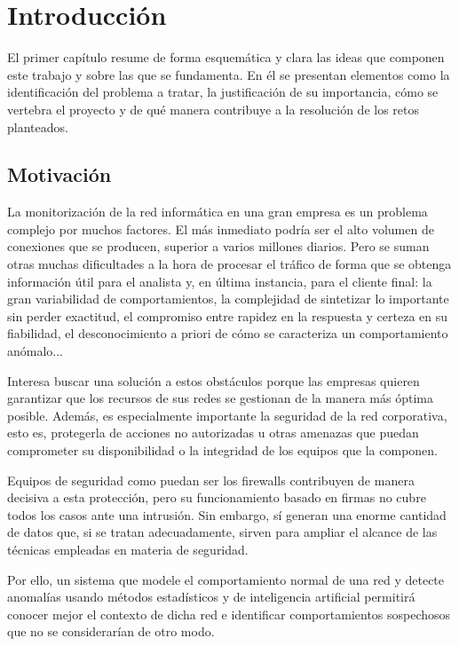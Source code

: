 \chapter{Introducción}\label{chap:introduccion}

El primer capítulo resume de forma esquemática y clara las ideas que componen este trabajo y sobre las que se fundamenta.
En él se presentan elementos como la identificación del problema a tratar, la justificación de su importancia, cómo se vertebra el proyecto y de qué manera contribuye a la resolución de los retos planteados.

\section{Motivación}\label{sec:motivacion}

La monitorización de la red informática en una gran empresa es un problema complejo por muchos factores.
El más inmediato podría ser el alto volumen de conexiones que se producen, superior a varios millones diarios.
Pero se suman otras muchas dificultades a la hora de procesar el tráfico de forma que se obtenga información útil para el analista y, en última instancia, para el cliente final:
la gran variabilidad de comportamientos, la complejidad de sintetizar lo importante sin perder exactitud,
el compromiso entre rapidez en la respuesta y certeza en su fiabilidad, el desconocimiento a priori de cómo se caracteriza un comportamiento anómalo...

Interesa buscar una solución a estos obstáculos porque las empresas quieren garantizar que los recursos de sus redes se gestionan de la manera más óptima posible.
Además, es especialmente importante la seguridad de la red corporativa, esto es, protegerla de acciones no autorizadas u otras amenazas que puedan comprometer su disponibilidad o la integridad de los equipos que la componen.

Equipos de seguridad como puedan ser los firewalls contribuyen de manera decisiva a esta protección, pero su funcionamiento basado en firmas no cubre todos los casos ante una intrusión.
Sin embargo, sí generan una enorme cantidad de datos que, si se tratan adecuadamente, sirven para ampliar el alcance de las técnicas empleadas en materia de seguridad.

Por ello, un sistema que modele el comportamiento normal de una red y detecte anomalías usando métodos estadísticos y de inteligencia artificial permitirá
conocer mejor el contexto de dicha red e identificar comportamientos sospechosos que no se considerarían de otro modo.

